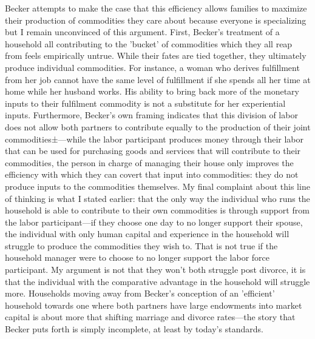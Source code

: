 \documentclass{article}
\begin{document}
Becker attempts to make the case that this efficiency allows families to maximize their production of commodities they care about because everyone is specializing but I remain unconvinced of this argument. First, Becker's treatment of a household all contributing to the 'bucket' of commodities which they all reap from feels empirically untrue. While their fates are tied together, they ultimately produce individual commodities. For instance, a woman who derives fulfillment from her job cannot have the same level of fulfillment if she spends all her time at home while her husband works. His ability to bring back more of the monetary inputs to their fulfilment commodity is not a substitute for her experiential inputs. Furthermore, Becker's own framing indicates that this division of labor does not allow both partners to contribute equally to the production of their joint commodities±—while the labor participant produces money through their labor that can be used for purchasing goods and services that will contribute to their commodities, the person in charge of managing their house only improves the efficiency with which they can covert that input into commodities: they do not produce inputs to the commodities themselves. My final complaint about this line of thinking is what I stated earlier: that the only way the individual who runs the household is able to contribute to their own commodities is through support from the labor participant—if they choose one day to no longer support their spouse, the individual with only human capital and experience in the household will struggle to produce the commodities they wish to. That is not true if the household manager were to choose to no longer support the labor force participant. My argument is not that they won't both struggle post divorce, it is that the individual with the comparative advantage in the household will struggle more. Households moving away from Becker's conception of an 'efficient' household towards one where both partners have large endowments into market capital is about more that shifting marriage and divorce rates—the story that Becker puts forth is simply incomplete, at least by today's standards.
\end{document}
